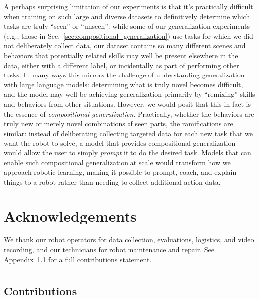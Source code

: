 \documentclass[conference]{IEEEtran}
\begin{document}
A perhaps surprising limitation of our experiments is that it's practically difficult when training on such large and diverse datasets to definitively determine which tasks are truly ``seen'' or ``unseen'': while some of our generalization experiments (e.g., those in Sec.~\ref{sec:compositional_generalization}) use tasks for which we did not deliberately collect data, our dataset contains so many different scenes and behaviors that potentially related skills may well be present elsewhere in the data, either with a different label, or incidentally as part of performing other tasks. In many ways this mirrors the challenge of understanding generalization with large language models: determining what is truly novel becomes difficult, and the model may well be achieving generalization primarily by ``remixing'' skills and behaviors from other situations. However, we would posit that this in fact is the essence of \emph{compositional generalization}. Practically, whether the behaviors are truly new or merely novel combinations of seen parts, the ramifications are similar: instead of deliberating collecting targeted data for each new task that we want the robot to solve, a model that provides compositional generalization would allow the user to simply \emph{prompt} it to do the desired task. Models that can enable such compositional generalization at scale would transform how we approach robotic learning, making it possible to prompt, coach, and explain things to a robot rather than needing to collect additional action data.

\section*{Acknowledgements}

We thank our robot operators for data collection, evaluations, logistics, and video recording, and our technicians for robot maintenance and repair. See Appendix~\ref{app:contributions} for a full contributions statement.





\clearpage

\appendix

\section{}


\subsection{Contributions}
\label{app:contributions}
\end{document}
